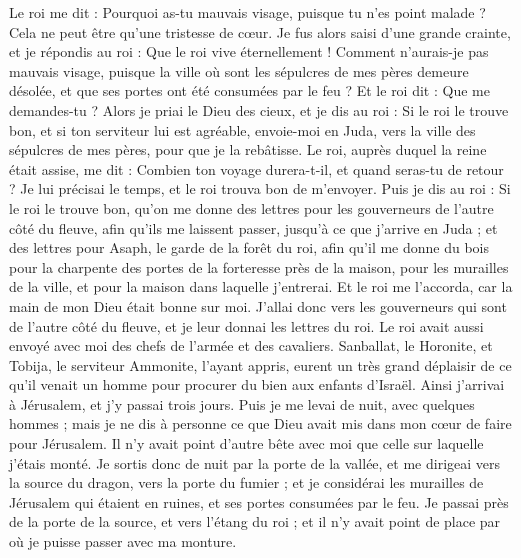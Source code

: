 \begin{multicols}{2}
Le roi me dit : Pourquoi as-tu mauvais visage, puisque tu n'es point malade ? Cela ne peut être qu’une tristesse de cœur. Je fus alors saisi d'une grande crainte,
et je répondis au roi : Que le roi vive éternellement ! Comment n'aurais-je pas mauvais visage, puisque la ville où sont les sépulcres de mes pères demeure désolée, et que ses portes ont été consumées par le feu ?
Et le roi dit : Que me demandes-tu ? Alors je priai le Dieu des cieux,
et je dis au roi : Si le roi le trouve bon, et si ton serviteur lui est agréable, envoie-moi en Juda, vers la ville des sépulcres de mes pères, pour que je la rebâtisse.
Le roi, auprès duquel la reine était assise, me dit : Combien ton voyage durera-t-il, et quand seras-tu de retour ? Je lui précisai le temps, et le roi trouva bon de m'envoyer.
Puis je dis au roi : Si le roi le trouve bon, qu'on me donne des lettres pour les gouverneurs de l'autre côté du fleuve, afin qu'ils me laissent passer, jusqu'à ce que j'arrive en Juda ;
et des lettres pour Asaph, le garde de la forêt du roi, afin qu'il me donne du bois pour la charpente des portes de la forteresse près de la maison, pour les murailles de la ville, et pour la maison dans laquelle j'entrerai. Et le roi me l'accorda, car la main de mon Dieu était bonne sur moi.
J’allai donc vers les gouverneurs qui sont de l’autre côté du fleuve, et je leur donnai les lettres du roi. Le roi avait aussi envoyé avec moi des chefs de l’armée et des cavaliers.
Sanballat, le Horonite, et Tobija, le serviteur Ammonite, l’ayant appris, eurent un très grand déplaisir de ce qu'il venait un homme pour procurer du bien aux enfants d'Israël.
Ainsi j'arrivai à Jérusalem, et j'y passai trois jours.
Puis je me levai de nuit, avec quelques hommes ; mais je ne dis à personne ce que Dieu avait mis dans mon cœur de faire pour Jérusalem. Il n'y avait point d'autre bête avec moi que celle sur laquelle j'étais monté.
Je sortis donc de nuit par la porte de la vallée, et me dirigeai vers la source du dragon, vers la porte du fumier ; et je considérai les murailles de Jérusalem qui étaient en ruines, et ses portes consumées par le feu.
Je passai près de la porte de la source, et vers l'étang du roi ; et il n'y avait point de place par où je puisse passer avec ma monture.

\end{multicols}
